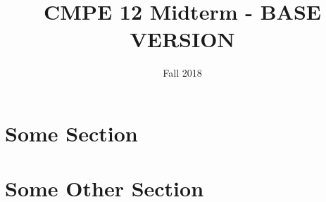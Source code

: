 \documentclass[11pt] {exam3}
\begin{document}
\title{CMPE 12 Midterm - BASE VERSION}
\date{Fall 2018}
\maketitle

\thispagestyle{headings}
\setlength{\partopsep}{0pt}

\section*{Some Section}



\section*{Some Other Section}

\end{document}
